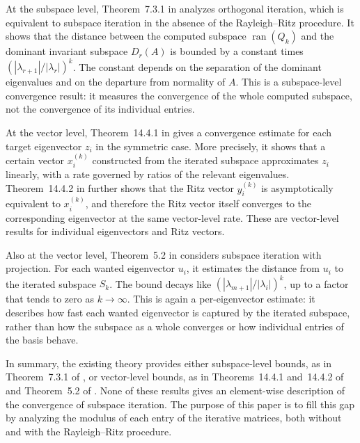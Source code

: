 \documentclass[11pt,a4paper]{article}
\theoremstyle{plain}              %
\theoremstyle{definition}         %
\begin{document}
At the subspace level, Theorem~7.3.1 in \cite{golub_book} analyzes orthogonal iteration, which is equivalent to subspace iteration in the absence of the Rayleigh--Ritz procedure. It shows that the distance between the computed subspace \(\operatorname{ran}(Q_k)\) and the dominant invariant subspace \(D_r(A)\) is bounded by a constant times \((|\lambda_{r+1}|/|\lambda_r|)^k\). The constant depends on the separation of the dominant eigenvalues and on the departure from normality of \(A\). This is a subspace-level convergence result: it measures the convergence of the whole computed subspace, not the convergence of its individual entries.

At the vector level, Theorem~14.4.1 in \cite{parlett_book} gives a convergence estimate for each target eigenvector \(z_i\) in the symmetric case. More precisely, it shows that a certain vector \(x_i^{(k)}\) constructed from the iterated subspace approximates \(z_i\) linearly, with a rate governed by ratios of the relevant eigenvalues. Theorem~14.4.2 in \cite{parlett_book} further shows that the Ritz vector \(y_i^{(k)}\) is asymptotically equivalent to \(x_i^{(k)}\), and therefore the Ritz vector itself converges to the corresponding eigenvector at the same vector-level rate. These are vector-level results for individual eigenvectors and Ritz vectors.

Also at the vector level, Theorem~5.2 in \cite{saad_book} considers subspace iteration with projection. For each wanted eigenvector \(u_i\), it estimates the distance from \(u_i\) to the iterated subspace \(S_k\). The bound decays like \((|\lambda_{m+1}|/|\lambda_i|)^k\), up to a factor that tends to zero as \(k\to\infty\). This is again a per-eigenvector estimate: it describes how fast each wanted eigenvector is captured by the iterated subspace, rather than how the subspace as a whole converges or how individual entries of the basis behave.

In summary, the existing theory provides either subspace-level bounds, as in Theorem~7.3.1 of \cite{golub_book}, or vector-level bounds, as in Theorems~14.4.1 and~14.4.2 of \cite{parlett_book} and Theorem~5.2 of \cite{saad_book}. None of these results gives an element-wise description of the convergence of subspace iteration. The purpose of this paper is to fill this gap by analyzing the modulus of each entry of the iterative matrices, both without and with the Rayleigh--Ritz procedure.
\end{document}
